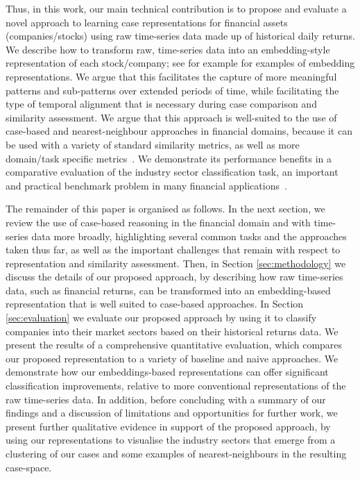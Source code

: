 \documentclass[runningheads]{llncs}
\begin{document}

Thus, in this work, our main technical contribution is to propose and evaluate a novel approach to learning case representations for financial assets (companies/stocks) using raw time-series data made up of historical daily returns. We describe how to transform raw, time-series data into an embedding-style representation of each stock/company; see for example \cite{mikolov2013efficient,nalmpantis2019signal2vec} for examples of embedding representations. We argue that this facilitates the capture of more meaningful patterns and sub-patterns over extended periods of time, while facilitating the type of temporal alignment that is necessary during case comparison and similarity assessment. We argue that this approach is well-suited to the use of case-based and nearest-neighbour approaches in financial domains, because it can be used with a variety of standard similarity metrics, as well as more domain/task specific metrics~\cite{dolphin2021measuring}.  We demonstrate its performance benefits in a comparative evaluation of the industry sector classification task, an important and practical benchmark problem in many financial applications~\cite{phillips2016industry}. 

The remainder of this paper is organised as follows. In the next section, we review the use of case-based reasoning in the financial domain and with time-series data more broadly, highlighting several common tasks and the approaches taken thus far, as well as the important challenges that remain with respect to representation and similarity assessment. Then, in Section \ref{sec:methodology} we discuss the details of our proposed approach, by describing how raw time-series data, such as financial returns, can be transformed into an embedding-based representation that is well suited to case-based approaches. In Section \ref{sec:evaluation} we evaluate our proposed approach by using it to classify companies into their market sectors based on their historical returns data. We present the results of a comprehensive quantitative evaluation, which compares our proposed representation to a variety of baseline and naive approaches. We demonstrate how our embeddings-based representations can offer significant classification improvements, relative to more conventional representations of the raw time-series data. In addition, before concluding with a summary of our findings and a discussion of limitations and opportunities for further work, we present further qualitative evidence in support of the proposed approach, by using our representations to visualise the industry sectors that emerge from a clustering of our cases and some examples of nearest-neighbours in the resulting case-space.
\end{document}
